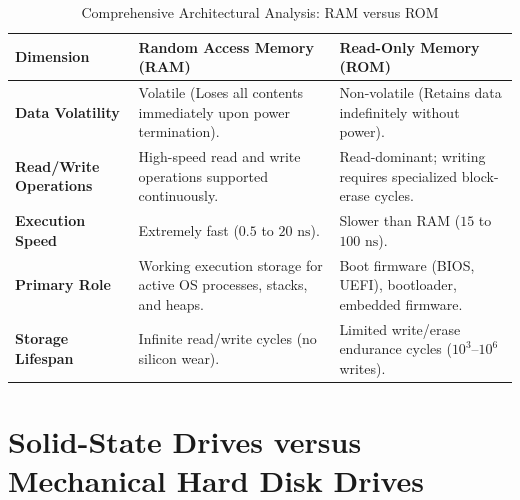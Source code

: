 \begin{table}[htbp]
\centering
\small
\caption{Comprehensive Architectural Analysis: RAM versus ROM}
\label{tab:ram_vs_rom}
\begin{tabularx}{\textwidth}{l X X}
\toprule
\textbf{Dimension} & \textbf{Random Access Memory (RAM)} & \textbf{Read-Only Memory (ROM)} \\
\midrule
\textbf{Data Volatility} & Volatile (Loses all contents immediately upon power termination). & Non-volatile (Retains data indefinitely without power). \\
\textbf{Read/Write Operations} & High-speed read and write operations supported continuously. & Read-dominant; writing requires specialized block-erase cycles. \\
\textbf{Execution Speed} & Extremely fast ($0.5$ to $20\text{ ns}$). & Slower than RAM ($15$ to $100\text{ ns}$). \\
\textbf{Primary Role} & Working execution storage for active OS processes, stacks, and heaps. & Boot firmware (BIOS, UEFI), bootloader, embedded firmware. \\
\textbf{Storage Lifespan} & Infinite read/write cycles (no silicon wear). & Limited write/erase endurance cycles ($10^3$--$10^6$ writes). \\
\bottomrule
\end{tabularx}
\end{table}


\section{Solid-State Drives versus Mechanical Hard Disk Drives}
\label{sec:ssd_vs_hdd}

